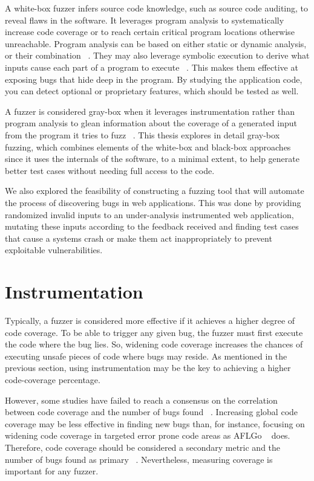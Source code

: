 A white-box fuzzer infers source code knowledge, such as source code auditing, to reveal
flaws in the software. It leverages program analysis to systematically
increase code coverage or to reach certain critical program locations otherwise unreachable. Program analysis can be based on either static or dynamic analysis, or their combination ~\cite{program_analysis_book}. They may also leverage symbolic execution to derive what inputs cause each part of a program to execute ~\cite{king1976symoblic}. This makes them effective at exposing bugs that hide deep in the program. By studying the application code, you can detect optional or proprietary features, which should be tested as well.

A fuzzer is considered gray-box when it leverages instrumentation rather than program analysis to glean information about the coverage of a generated input from the program it tries to fuzz ~\cite{zalewski2015american,efs2007}. This thesis explores in detail gray-box fuzzing, which combines elements of the white-box and black-box approaches since it uses the internals of the software, to a minimal extent, to help generate better test cases without needing full access to the code. 

We also explored the feasibility of constructing a fuzzing tool that will automate the process of discovering bugs in web applications. This was done by providing randomized invalid inputs to an under-analysis instrumented web application, mutating these inputs according to the feedback received and finding test cases that cause a systems crash or make them act inappropriately to prevent exploitable vulnerabilities.

\section{Instrumentation}
Typically, a fuzzer is considered more effective if it achieves a higher degree of code coverage. To be able to trigger any given bug, the fuzzer must first execute the code where the bug lies. So, widening code coverage increases the chances of executing unsafe pieces of code where bugs may reside. As mentioned in the previous section, using instrumentation may be the key to achieving a higher code-coverage percentage. 

However, some studies have failed to reach a consensus on the correlation between code coverage and the number of bugs found ~\cite{klees2018Evaluation,coverage2014effectiveness}. 
Increasing global code coverage may be less effective in finding new bugs than, for instance, focusing on widening code coverage in targeted error prone code areas as AFLGo ~\cite{bohme2017directed} does. Therefore, code coverage should be considered a secondary metric and the number of bugs found as primary ~\cite{klees2018Evaluation}. Nevertheless, measuring coverage is important for any fuzzer.

